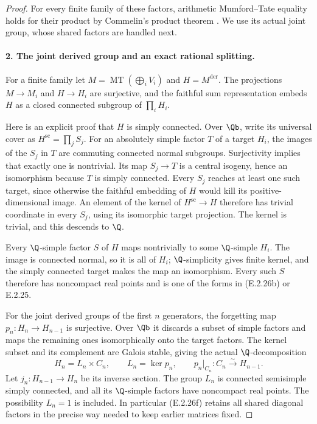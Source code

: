 \begin{proof}
For every finite family of these factors, arithmetic
Mumford--Tate equality holds for their product by Commelin's
product theorem
\cite[Theorem 10.5, p.~676]{GenCommelin2019}.
We use its actual joint group, whose shared factors are handled
next.

\paragraph{2. The joint derived group and an exact rational splitting.}
For a finite family let
\(M=\operatorname{MT}(\bigoplus_iV_i)\) and \(H=M^{\mathrm{der}}\).
The projections \(M\to M_i\) and \(H\to H_i\) are surjective,
and the faithful sum representation embeds \(H\) as a closed
connected subgroup of \(\prod_iH_i\).

Here is an explicit proof that \(H\) is simply connected.
Over \(\Qb\), write its universal cover as
\(H^{\mathrm{sc}}=\prod_jS_j\). For an absolutely simple
factor \(T\) of a target \(H_i\), the images of the \(S_j\)
in \(T\) are commuting connected normal subgroups. Surjectivity
implies that exactly one is nontrivial. Its map \(S_j\to T\)
is a central isogeny, hence an isomorphism because \(T\) is
simply connected. Every \(S_j\) reaches at least one such
target, since otherwise the faithful embedding of \(H\) would
kill its positive-dimensional image. An element of the kernel
of \(H^{\mathrm{sc}}\to H\) therefore has trivial coordinate
in every \(S_j\), using its isomorphic target projection.
The kernel is trivial, and this descends to \(\Q\).

Every \(\Q\)-simple factor \(S\) of \(H\) maps nontrivially
to some \(\Q\)-simple \(H_i\). The image is connected normal,
so it is all of \(H_i\); \(\Q\)-simplicity gives finite
kernel, and the simply connected target makes the map an
isomorphism. Every such \(S\) therefore has noncompact real
points and is one of the forms in (E.2.26b) or E.2.25.

For the joint derived groups of the first \(n\) generators,
the forgetting map \(p_n:H_n\to H_{n-1}\) is surjective.
Over \(\Qb\) it discards a subset of simple factors and maps
the remaining ones isomorphically onto the target factors.
The kernel subset and its complement are Galois stable, giving
the actual \(\Q\)-decomposition
\[
 H_n=L_n\times C_n,\qquad L_n=\ker p_n,
 \qquad p_n|_{C_n}:C_n\xrightarrow{\sim}H_{n-1}.
 \tag{E.2.26f}
\]
Let \(j_n:H_{n-1}\to H_n\) be its inverse section.
The group \(L_n\) is connected semisimple simply connected,
and all its \(\Q\)-simple factors have noncompact real points.
The possibility \(L_n=1\) is included. In particular (E.2.26f)
retains all shared diagonal factors in the precise way needed
to keep earlier matrices fixed.


\end{proof}
